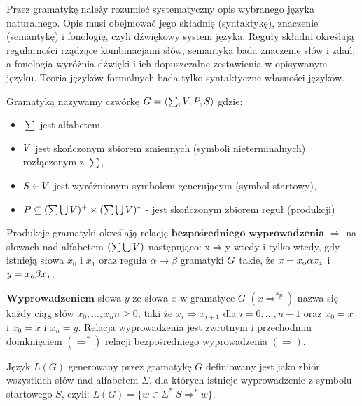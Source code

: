 \noindent Przez gramatykę należy rozumieć systematyczny opis wybranego języka naturalnego. Opis musi obejmować jego składnię (syntaktykę), znaczenie (semantykę) i fonologię, czyli dźwiękowy system języka. Reguły składni określają regularności rządzące kombinacjami słów, semantyka bada znaczenie słów i zdań, a fonologia wyróżnia dźwięki i ich dopuszczalne zestawienia w opisywanym języku. Teoria języków formalnych bada tylko syntaktyczne własności języków.  


\begin{definicja}
	Gramatyką nazywamy czwórkę $\mathnormal{G = \langle \sum, V, P, S \rangle}$ gdzie: 
	\begin{itemize}
	\item $\sum$ jest alfabetem,
	\item $\mathnormal{V}$ jest skończonym zbiorem zmiennych (symboli nieterminalnych) rozłączonym z $\sum$,
	\item $\mathnormal{S \in V}$ jest wyróżnionym symbolem generującym (symbol startowy),
	\item $\mathnormal{P \subseteq ( \sum \bigcup V )^{+} \times (\sum \bigcup V)^{*}}$ - jest skończonym zbiorem reguł (produkcji)
	\end{itemize}
\end{definicja}

 \begin{definicja}
	Produkcje gramatyki określają relację $\textbf{bezpośredniego wyprowadzenia}$ $\Rightarrow$ na słowach nad alfabetem $\mathnormal{( \sum \bigcup V )}$ następująco: \newline x$\Rightarrow$y wtedy i tylko wtedy, gdy istnieją słowa $x_{0}$ i $x_{1}$ oraz reguła $ \alpha \rightarrow \beta $ gramatyki $\mathnormal{G}$ takie, że $\mathnormal{x=x_{0} \alpha x_{1}}$ i $\mathnormal{y=x_{0} \beta x_{1}}$.
\end{definicja}

 \begin{definicja}
	$\textbf{Wyprowadzeniem}$ słowa $y$ ze słowa $x$ w gramatyce $G$ $(x \Rightarrow^{*y})$ nazwa się każdy ciąg słów $x_{0}, ..., x_{n}n \ge 0$, taki że $x_{i} \Rightarrow x_{i+1}$ dla $i=0, ..., n-1$ oraz $x_{0} = x $ i $x_{0} = x $ i $ x_{n} = y $. Relacja wyprowadzenia jest zwrotnym i przechodnim domknięciem  $(\Rightarrow^{*})$ relacji bezpośredniego wyprowadzenia $(\Rightarrow)$.
\end{definicja}

\begin{definicja}
	Język $L(G)$ generowany przez gramatykę $G$ definiowany jest jako zbiór wszystkich słów nad alfabetem $\Sigma$, dla których istnieje wyprowadzenie z symbolu startowego $S$, czyli: $L(G) = \{ w \in \Sigma^{*} | S \Rightarrow^{*} w \}$.
\end{definicja}

